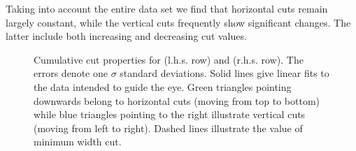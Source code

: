 		Taking into account the entire data set we find that horizontal cuts remain largely constant, while the vertical cuts frequently show significant changes. The latter include both increasing and decreasing cut values.

		\begin{figure}
			\centering
			\qquad
			\newline
			\qquad
			\newline
			\qquad
			
			\caption[Cut properties.]{Cumulative cut properties for  (l.h.s. row) and  (r.h.s. row). The errors denote one $\sigma$ standard deviations. Solid lines give linear fits to the data intended to guide the eye. Green triangles pointing downwards belong to horizontal cuts (moving from top to bottom) while blue triangles pointing to the right illustrate vertical cuts (moving from left to right). Dashed lines illustrate the value of minimum width cut.}
			\label{fig:cuts}
		\end{figure}

